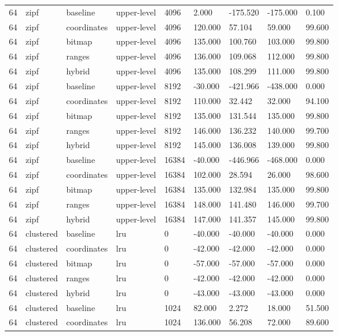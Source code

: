 \begin{tabular}{lllllllll}
64 & zipf & baseline & upper-level & 4096 & 2.000 & -175.520 & -175.000 & 0.100 \\
64 & zipf & coordinates & upper-level & 4096 & 120.000 & 57.104 & 59.000 & 99.600 \\
64 & zipf & bitmap & upper-level & 4096 & 135.000 & 100.760 & 103.000 & 99.800 \\
64 & zipf & ranges & upper-level & 4096 & 136.000 & 109.068 & 112.000 & 99.800 \\
64 & zipf & hybrid & upper-level & 4096 & 135.000 & 108.299 & 111.000 & 99.800 \\
64 & zipf & baseline & upper-level & 8192 & -30.000 & -421.966 & -438.000 & 0.000 \\
64 & zipf & coordinates & upper-level & 8192 & 110.000 & 32.442 & 32.000 & 94.100 \\
64 & zipf & bitmap & upper-level & 8192 & 135.000 & 131.544 & 135.000 & 99.800 \\
64 & zipf & ranges & upper-level & 8192 & 146.000 & 136.232 & 140.000 & 99.700 \\
64 & zipf & hybrid & upper-level & 8192 & 145.000 & 136.008 & 139.000 & 99.800 \\
64 & zipf & baseline & upper-level & 16384 & -40.000 & -446.966 & -468.000 & 0.000 \\
64 & zipf & coordinates & upper-level & 16384 & 102.000 & 28.594 & 26.000 & 98.600 \\
64 & zipf & bitmap & upper-level & 16384 & 135.000 & 132.984 & 135.000 & 99.800 \\
64 & zipf & ranges & upper-level & 16384 & 148.000 & 141.480 & 146.000 & 99.700 \\
64 & zipf & hybrid & upper-level & 16384 & 147.000 & 141.357 & 145.000 & 99.800 \\
64 & clustered & baseline & lru & 0 & -40.000 & -40.000 & -40.000 & 0.000 \\
64 & clustered & coordinates & lru & 0 & -42.000 & -42.000 & -42.000 & 0.000 \\
64 & clustered & bitmap & lru & 0 & -57.000 & -57.000 & -57.000 & 0.000 \\
64 & clustered & ranges & lru & 0 & -42.000 & -42.000 & -42.000 & 0.000 \\
64 & clustered & hybrid & lru & 0 & -43.000 & -43.000 & -43.000 & 0.000 \\
64 & clustered & baseline & lru & 1024 & 82.000 & 2.272 & 18.000 & 51.500 \\
64 & clustered & coordinates & lru & 1024 & 136.000 & 56.208 & 72.000 & 89.600 \\

\end{tabular}
